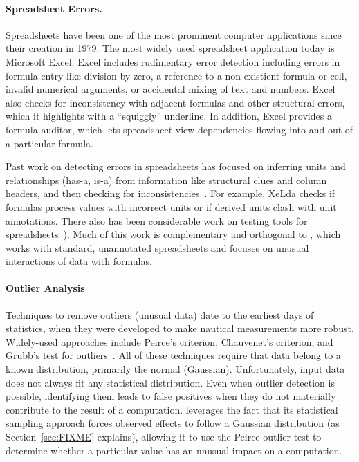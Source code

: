 \paragraph{Spreadsheet Errors.}
Spreadsheets have been one of the most prominent computer applications
since their creation in 1979.
 The most widely used spreadsheet application today is Microsoft
Excel. Excel includes rudimentary error detection including errors in
formula entry like division by zero, a reference to a non-existient
formula or cell, invalid numerical arguments, or accidental mixing of
text and numbers.
Excel also checks for inconsistency with adjacent formulas and other
structural errors, which it highlights with a ``squiggly'' underline. In addition, Excel provides a formula auditor, which lets spreadsheet view dependencies flowing into and out of a particular formula.

Past work on detecting errors in spreadsheets has focused on inferring
units and relationships (has-a, is-a) from information like structural
clues and column
headers, and then checking for inconsistencies~\cite{Antoniu:2004:VUC:998675.999448,DBLP:conf/kbse/AhmadAGK03,Chambers:2010:RSL:1860134.1860346,Erwig:2009:SES:1608570.1608694,Erwig:2005:AGM:1062455.1062494}. For
example, XeLda checks if formulas process values with incorrect units
or if derived units clash with unit annotations. There also has been
considerable work on testing tools for
spreadsheets~\cite{fisher2006scaling,rothermel1998you,rothermel2001methodology,Carver:2006:EET:1159733.1159775}). Much
of this work is complementary and orthogonal to \checkcell{}, which
works with standard, unannotated spreadsheets and focuses on unusual
interactions of data with formulas.



\paragraph{Outlier Analysis}

Techniques to remove outliers (unusual data) date to the earliest days
of statistics, when they were developed to make nautical measurements
more robust. Widely-used approaches include Peirce's criterion,
Chauvenet's criterion, and Grubb's test for outliers~\cite{barnett1994outliers}. All
of these techniques require that data belong to a known distribution,
primarily the normal (Gaussian). Unfortunately, input data does not
always fit any statistical distribution. Even when outlier detection is
possible, identifying them leads to false positives when they do not
materially contribute to the result of a computation.
\checkcell{} leverages the
fact that its statistical sampling approach forces observed effects to
follow a Gaussian distribution (as Section~\ref{sec:FIXME} explains),
allowing it to use the Peirce outlier test to determine whether a
particular value has an unusual impact on a computation.

